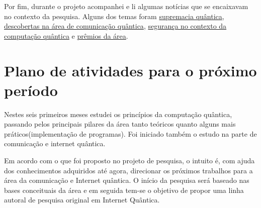 \documentclass{article}
\begin{document}
        Por fim, durante o projeto acompanhei e li algumas notícias que se encaixavam no contexto da pesquisa. Alguns dos temas foram \href{https://www.nature.com/articles/s41586-019-1666-5}{supremacia quântica}, \href{https://beta.nsf.gov/news/tiny-optical-cavities-could-make-quantum-networks-possible}{descobertas na área de comunicação quântica}, \href{https://beta.nsf.gov/news/toward-unhackable-quantum-internet}{segurança no contexto da computação quântica} e \href{https://www.nytimes.com/2022/10/04/science/nobel-prize-physics-winner.html?unlocked_article_code=AAAAAAAAAAAAAAAACEIPuonUktbfqYhlSFUbBybOVtkqqBaLwv7IyrE4w2fkLTqYDC5C3v8UCJPF5EbLY6d5Idsv2jDRDPlwDIgSft0ghOlOIx4qDACyvpqPnJlCLXhv9d3iAG1z0ZmTAfVlqjHnKzjgdLk6zeLk5x7dPmO9D6TYwmRhcFg-2eZtcV-g3HUPxqfXQKUiipQlg6BXVt0tTiwAZSKKo_HqFxx4Xd2GZRne4QAzMPpLDXCRxZXPruJdL3gBTA7OX3h94m0j6NpDONJxPK33LxcoecuWkqwcm8vTEA3ohQWqE9s2-L6Y&smid=nytcore-ios-share&referringSource=articleShare}{prêmios da área}.
    
\newpage



\section{Plano de atividades para o próximo período}
    Nestes seis primeiros meses estudei os princípios da computação quântica, passando pelos principais pilares da área tanto teóricos quanto alguns mais práticos(implementação de programas). Foi iniciado também o estudo na parte de comunicação e internet quântica.

     Em acordo com o que foi proposto no projeto de pesquisa, o intuito é, com ajuda dos conhecimentos adquiridos até agora, direcionar os próximos trabalhos para a área da comunicação e Internet quântica. O início da pesquisa será baseado nas bases conceituais da área e em seguida tem-se o objetivo de propor uma linha autoral de pesquisa original em Internet Quântica.
\end{document}
